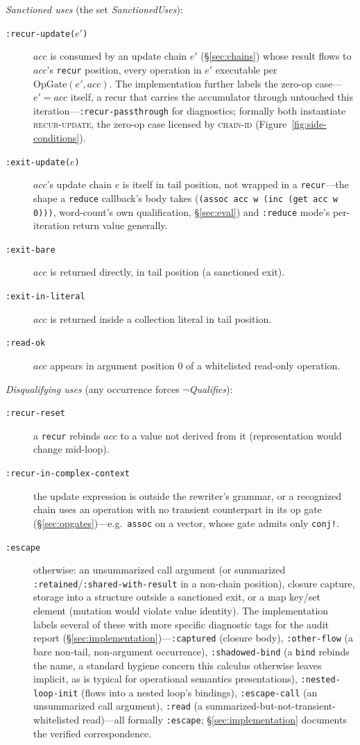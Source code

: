 \documentclass[sigplan,review,anonymous]{acmart}
\begin{document}
\emph{Sanctioned uses} (the set \emph{SanctionedUses}):
\begin{description}
    \item[\texttt{:recur-update($e'$)}] $acc$ is consumed by an update chain $e'$ (§\ref{sec:chains}) whose result flows to $acc$'s \texttt{recur} position, every operation in $e'$ executable per $\mathrm{OpGate}(e', acc)$. The implementation further labels the zero-op case---$e'=acc$ itself, a recur that carries the accumulator through untouched this iteration---\texttt{:recur-passthrough} for diagnostics; formally both instantiate \textsc{recur-update}, the zero-op case licensed by \textsc{chain-id} (Figure~\ref{fig:side-conditions}).
    \item[\texttt{:exit-update($e$)}] $acc$'s update chain $e$ is itself in tail position, not wrapped in a \texttt{recur}---the shape a \texttt{reduce} callback's body takes (\texttt{(assoc acc w (inc (get acc w 0)))}, word-count's own qualification, §\ref{sec:eval}) and \texttt{:reduce} mode's per-iteration return value generally.
    \item[\texttt{:exit-bare}] $acc$ is returned directly, in tail position (a sanctioned exit).
    \item[\texttt{:exit-in-literal}] $acc$ is returned inside a collection literal in tail position.
    \item[\texttt{:read-ok}] $acc$ appears in argument position 0 of a whitelisted read-only operation.
\end{description}

\emph{Disqualifying uses} (any occurrence forces $\neg$\emph{Qualifies}):
\begin{description}
    \item[\texttt{:recur-reset}] a \texttt{recur} rebinds $acc$ to a value not derived from it (representation would change mid-loop).
    \item[\texttt{:recur-in-complex-context}] the update expression is outside the rewriter's grammar, or a recognized chain uses an operation with no transient counterpart in its op gate (§\ref{sec:opgates})---e.g.\ \texttt{assoc} on a vector, whose gate admits only \texttt{conj!}.
    \item[\texttt{:escape}] otherwise: an unsummarized call argument (or summarized \texttt{:retained}/\texttt{:shared-with-result} in a non-chain position), closure capture, storage into a structure outside a sanctioned exit, or a map key/set element (mutation would violate value identity). The implementation labels several of these with more specific diagnostic tags for the audit report (§\ref{sec:implementation})---\texttt{:captured} (closure body), \texttt{:other-flow} (a bare non-tail, non-argument occurrence), \texttt{:shadowed-bind} (a \texttt{bind} rebinds the name, a standard hygiene concern this calculus otherwise leaves implicit, as is typical for operational semantics presentations), \texttt{:nested-loop-init} (flows into a nested loop's bindings), \texttt{:escape-call} (an unsummarized call argument), \texttt{:read} (a summarized-but-not-transient-whitelisted read)---all formally \texttt{:escape}; §\ref{sec:implementation} documents the verified correspondence.
\end{description}
\end{document}
